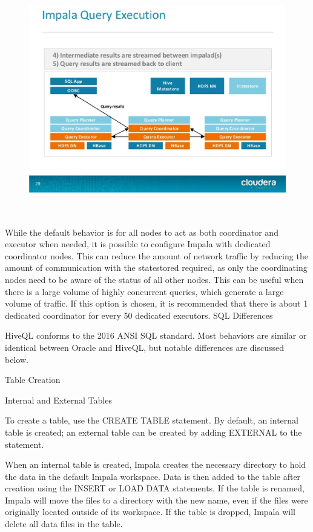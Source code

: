 \documentclass[onecolumn, draftclsnofoot,10pt, compsoc]{IEEEtran}
\begin{document}
\begin{figure}[ht]
    \centering
    \includegraphics[width=\linewidth, height=4in, keepaspectratio]{qc.eps}
\end{figure}

While the default behavior is for all nodes to act as both coordinator and executor when needed, it is possible to configure Impala with dedicated coordinator nodes.
This can reduce the amount of network traffic by reducing the amount of communication with the statestored required, as only the coordinating nodes need to be aware of the status of all other nodes.
This can be useful when there is a large volume of highly concurrent queries, which generate a large volume of traffic.
If this option is chosen, it is recommended that there is about 1 dedicated coordinator for every 50 dedicated executors. 
\newline
SQL Differences


HiveQL conforms to the 2016 ANSI SQL standard. 
Most behaviors are similar or identical between Oracle and HiveQL, but notable differences are discussed below. 

Table Creation

Internal and External Tables

To create a table, use the CREATE TABLE statement. 
By default, an internal table is created; an external table can be created by adding EXTERNAL to the statement. 

When an internal table is created, Impala creates the necessary directory to hold the data in the default Impala workspace. 
Data is then added to the table after creation using the INSERT or LOAD DATA statements. 
If the table is renamed, Impala will move the files to a directory with the new name, even if the files were originally located outside of its workspace. 
If the table is dropped, Impala will delete all data files in the table. 
\end{document}
